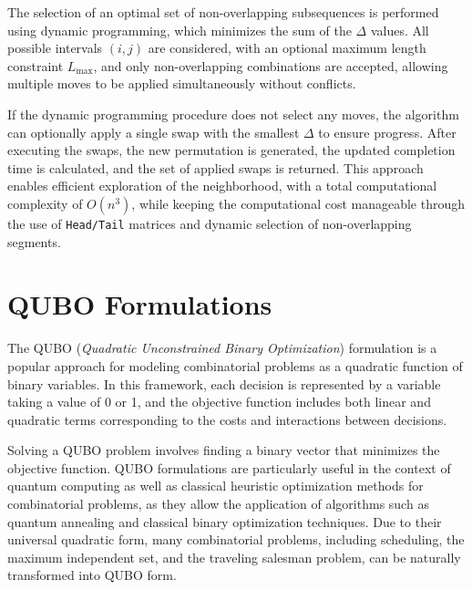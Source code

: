 \documentclass[10pt,twoside,twocolumn,a4paper]{article}
\begin{document}
The selection of an optimal set of non-overlapping subsequences is performed using dynamic programming, which minimizes the sum of the $\Delta$ values. All possible intervals $(i,j)$ are considered, with an optional maximum length constraint $L_{\max}$, and only non-overlapping combinations are accepted, allowing multiple moves to be applied simultaneously without conflicts.

If the dynamic programming procedure does not select any moves, the algorithm can optionally apply a single swap with the smallest $\Delta$ to ensure progress. After executing the swaps, the new permutation is generated, the updated completion time is calculated, and the set of applied swaps is returned. This approach enables efficient exploration of the neighborhood, with a total computational complexity of $O(n^3)$, while keeping the computational cost manageable through the use of \texttt{Head/Tail} matrices and dynamic selection of non-overlapping segments.


\section{QUBO Formulations}
The QUBO (\emph{Quadratic Unconstrained Binary Optimization}) formulation is a popular approach for modeling combinatorial problems as a quadratic function of binary variables. In this framework, each decision is represented by a variable taking a value of 0 or 1, and the objective function includes both linear and quadratic terms corresponding to the costs and interactions between decisions.

Solving a QUBO problem involves finding a binary vector that minimizes the objective function. QUBO formulations are particularly useful in the context of quantum computing as well as classical heuristic optimization methods for combinatorial problems, as they allow the application of algorithms such as quantum annealing and classical binary optimization techniques. Due to their universal quadratic form, many combinatorial problems, including scheduling, the maximum independent set, and the traveling salesman problem, can be naturally transformed into QUBO form.
\end{document}
